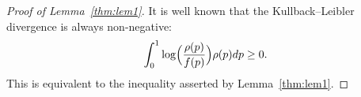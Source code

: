 \documentclass{article}
\theoremstyle{definition}
\begin{document}
\begin{proof}[Proof of Lemma~\ref{thm:lem1}]
It is well known \citep[][p.~14]{kullback:1959} that the Kullback--Leibler divergence
is always non-negative:
$$
  \int_0^1\log\Bigl(\frac{\rho(p)}{f(p)}\Bigr)\rho(p) dp \geq 0.
$$
This is equivalent to the inequality asserted by Lemma~\ref{thm:lem1}.
%
\end{proof}
\end{document}
